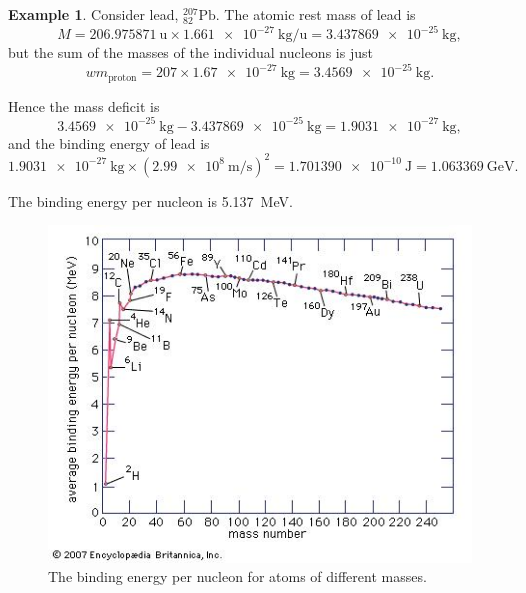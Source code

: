 \documentclass[a4paper]{amsbook}
\theoremstyle{definition}
\newtheorem*{example}{Example}
\numberwithin{exercise}{chapter}
\numberwithin{exercise}{chapter}
\begin{document}
\begin{example}
  Consider lead, $ ^{207}_{82}\mathrm{Pb} $. The atomic rest mass of lead is
  \begin{displaymath}
    M = \SI{206.975871}{\amu} \times \SI{1.661e-27}{\kilo\gram\per\amu} = \SI{3.437869e-25}{\kilo\gram},
  \end{displaymath}
  but the sum of the masses of the individual nucleons is just
  \begin{displaymath}
    wm_\text{proton} = 207\times\SI{1.67e-27}{\kilo\gram} = \SI{3.4569e-25}{\kilo\gram}.
  \end{displaymath}

  Hence the mass deficit is
  \begin{displaymath}
    \SI{3.4569e-25}{\kilo\gram} - \SI{3.437869e-25}{\kilo\gram} = \SI{1.9031e-27}{\kilo\gram},
  \end{displaymath}
  and the binding energy of lead is
  \begin{displaymath}
    \SI{1.9031e-27}{\kilo\gram} \times \left( \SI{2.99e8}{\metre\per\second} \right)^2 = \SI{1.701390e-10}{\joule} = \SI{1.063369}{\giga\electronvolt}.
  \end{displaymath}

  The binding energy per nucleon is \SI{5.137}{\mega\electronvolt}.
\end{example}

\begin{figure}
  \centering
  \includegraphics[width=\textwidth]{bindinges}
  \caption{The binding energy per nucleon for atoms of different masses. \label{fig:bindinges}}
\end{figure}
\end{document}
